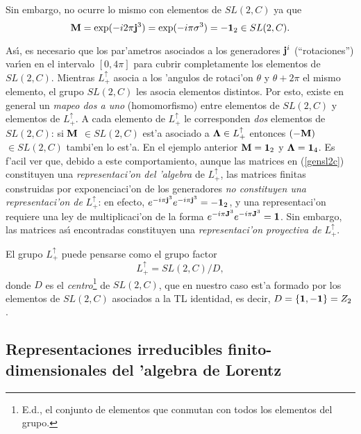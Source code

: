 Sin embargo, no ocurre lo mismo con elementos de $SL(2,C)$ ya que 
\begin{equation}
{\bf M}=\exp (-i2\pi {\bf j}^3)=\exp (-i\pi {\bf \sigma }^3)=-{\bf 1}%
_{2}\in SL(2,C). 
\end{equation}

As{\'{\i }}, es necesario que los par'ametros asociados a los generadores 
${\bf j}^{i}$ (``rotaciones'') var{\'{\i }}en en el intervalo $[0,4\pi ]$
para cubrir completamente los elementos de $SL(2,C)$. Mientras $%
L_{+}^{\uparrow }$ asocia a los 'angulos de rotaci'on $\theta $ y $%
\theta +2\pi $ el mismo elemento, el grupo $SL(2,C)$ les asocia elementos
distintos. Por esto, existe en general un \textit{mapeo dos a uno} (homomorfismo)
entre elementos de $SL(2,C)$ y elementos de $L_{+}^{\uparrow }$. A cada
elemento de $L_{+}^{\uparrow }$ le corresponden {\em dos} elementos de $%
SL(2,C)$: si ${\bf M}$ $\in SL(2,C)$ est'a asociado a ${\bf \Lambda }\in
L_{+}^{\uparrow }$ entonces $\left( -{\bf M}\right) $ $\in SL(2,C)$
tambi'en lo est'a. En el ejemplo anterior ${\bf M}={\bf 1}_{2}$ y $%
{\bf \Lambda }={\bf 1}_{4}$. Es f'acil ver que, debido a este
comportamiento, aunque las matrices en (\ref{gensl2c}) constituyen una {\em %
representaci'on del 'algebra} de $L_{+}^{\uparrow }$, las matrices
finitas construidas por exponenciaci'on de los generadores {\em no
constituyen una representaci'on de }$L_{+}^{\uparrow }$: en efecto, $%
e^{-i\pi {\bf j}^3}e^{-i\pi {\bf j}^3}=-{\bf 1}_{2}$, y una
representaci'on requiere una ley de multiplicaci'on de la forma $%
e^{-i\pi {\bf J}^3}e^{-i\pi {\bf J}^3}={\bf 1}$. Sin embargo, las
matrices as{\'{\i }} encontradas constituyen una {\em representaci'on
proyectiva de }$L_{+}^{\uparrow }$.

El grupo $L_{+}^{\uparrow }$ puede pensarse \cite{Gilmore} como el grupo
factor 
\begin{equation}
L_{+}^{\uparrow }=SL(2,C)/D, 
\end{equation}
donde $D$ es el {\em centro}\footnote{%
E.d., el conjunto de elementos que conmutan con todos los elementos del
grupo.} de $SL(2,C)$, que en nuestro caso est'a formado por los elementos
de $SL(2,C)$ asociados a la TL identidad, es decir, $D=\left\{ {\bf 1,-1}%
\right\} =Z_{2}$.

\subsection{Representaciones irreducibles finito-dimensionales
del 'algebra de Lorentz\label{rifdal}}

